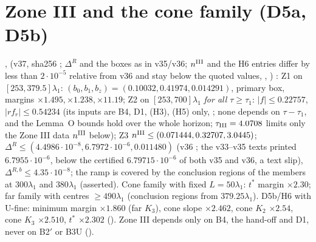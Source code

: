 \documentclass[11pt]{article}
\begin{document}
\section{Zone III and the cone family (D5a, D5b)}\label{M:sec:zone3}
,  (v37, sha256 ; $\Delta^R$ and the boxes as in v35/v36; $n^{\rm III}$ and the H6 entries differ by less than $2\cdot10^{-5}$ relative from v36 and stay below the quoted values, , ) \tC: Z1 on $[253,379.5]\lambda_1$: $(b_0,b_1,b_z)=(0.10032,0.41974,0.014291)$, primary box, margins $\times1.495,\times1.238,\times11.19$; Z2 on $[253,700]\lambda_1$ \emph{for all $\tau\ge\tau_1$}: $|f|\le0.22757$, $|rf_r|\le0.54234$ (its inputs are B4, D1, (H3), (H5) only, ; none depends on $\tau-\tau_1$, and the Lemma~O bounds hold over the whole horizon; $\tau_{\rm III}=4.0708$ limits only the Zone III data $n^{\rm III}$ below); Z3 $n^{\rm III}\le(0.071444,0.32707,3.0445)$; $\Delta^R\le(4.4986\cdot10^{-8},6.7972\cdot10^{-6},0.011480)$ (v36 ; the v33--v35 texts printed $6.7955\cdot10^{-6}$, below the certified $6.79715\cdot10^{-6}$ of both v35 and v36, a text slip), $\Delta^{R,b}\le4.35\cdot10^{-8}$; the ramp is covered by the conclusion regions of the members at $300\lambda_1$ and $380\lambda_1$ (asserted). Cone family with fixed $L=50\lambda_1$: $t^*$ margin $\times2.30$; far family with centres $\ge490\lambda_1$ (conclusion regions from $379.25\lambda_1$). D5b/H6 with U-fine: minimum margin $\times1.860$ (far $K_3$), cone slope $\times2.462$, cone $K_2$ $\times2.54$, cone $K_3$ $\times2.510$, $t^*$ $\times2.302$ (). Zone III depends only on B4, the hand-off and D1, never on B2$'$ or B3U ().


\end{document}
